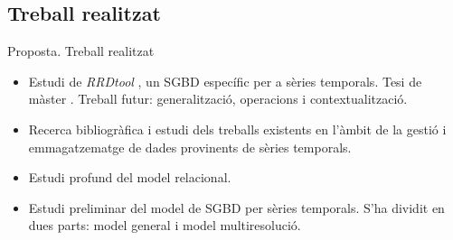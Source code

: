 \subsection{Treball realitzat}
\begin{frame}{Proposta. Treball realitzat}

  \begin{itemize}
  \item Estudi de \emph{RRDtool} \parencite{rrdtool}, un SGBD
    específic per a sèries temporals. Tesi de
    màster \parencite{llusa11:tfm}. Treball futur: generalització, operacions i
    contextualització.

  \item Recerca bibliogràfica i estudi dels treballs existents en
    l'àmbit de la gestió i emmagatzematge de dades provinents de
    sèries temporals.

  \item Estudi profund del model relacional. 

  \item Estudi preliminar del model de SGBD per sèries temporals. S'ha
    dividit en dues parts: model general i model multiresolució.

  \end{itemize}

\end{frame}


